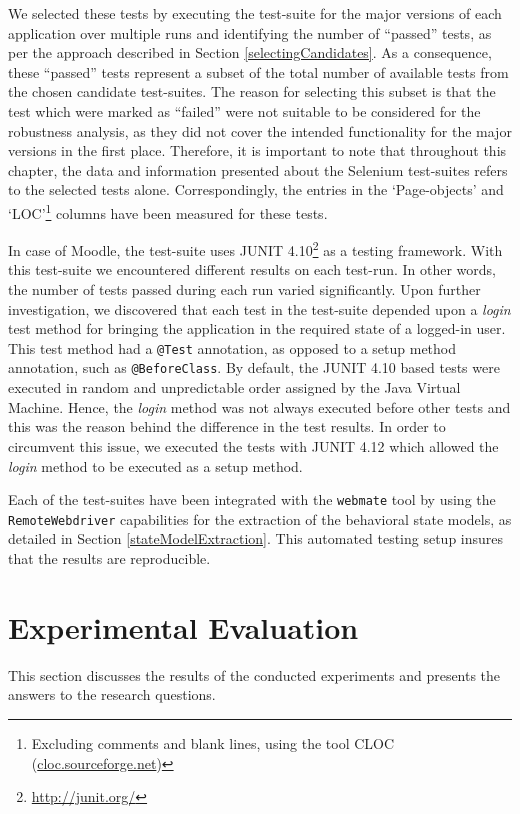 We selected these tests by executing the test-suite for the major versions of each application over multiple runs and identifying the number of ``passed'' tests, as per the approach described in Section \ref{selectingCandidates}. As a consequence, these ``passed'' tests represent a subset of the total number of available tests from the chosen candidate test-suites. The reason for selecting this subset is that the test which were marked as ``failed'' were not suitable to be considered for the robustness analysis, as they did not cover the intended functionality for the major versions in the first place. 
Therefore, it is important to note that throughout this chapter, the data and information presented about the Selenium test-suites refers to the selected tests alone. Correspondingly, the entries in the `Page-objects' and `LOC'\footnote{Excluding comments and blank lines, using the tool CLOC (\url{cloc.sourceforge.net})} columns have been measured for these tests.

In case of Moodle, the test-suite uses JUNIT 4.10\footnote{\url{http://junit.org/}} as a testing framework. With this test-suite we encountered different results on each test-run. In other words, the number of tests passed during each run varied significantly. Upon further investigation, we discovered that each test in the test-suite depended upon a \textit{login} test method for bringing the application in the required state of a logged-in user. This test method had a \texttt{@Test} annotation, as opposed to a setup method annotation, such as \texttt{@BeforeClass}. By default, the JUNIT 4.10 based tests were executed in random and unpredictable order assigned by the Java Virtual Machine. Hence, the \textit{login} method was not always executed before other tests and this was the reason behind the difference in the test results. In order to circumvent this issue, we executed the tests with JUNIT 4.12 which allowed the \textit{login} method to be executed as a setup method. 

Each of the test-suites have been integrated with the \texttt{webmate} tool by using the \texttt{RemoteWebdriver} capabilities for the extraction of the behavioral state models, as detailed in Section \ref{stateModelExtraction}. This automated testing setup insures that the results are reproducible. 

\section{Experimental Evaluation}
\label{expeval}
This section discusses the results of the conducted experiments and presents the answers to the research questions. 

